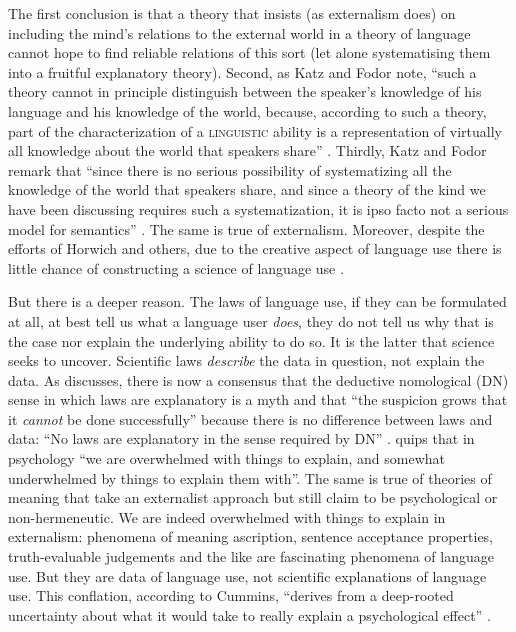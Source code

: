 The first conclusion is that a theory that insists (as externalism does) on including the mind’s relations to the external world in a theory of language cannot hope to find reliable relations of this sort (let alone systematising them into a fruitful explanatory theory). Second, as Katz and Fodor note, “such a theory cannot in principle distinguish between the speaker's knowledge of his language and his knowledge of the world, because, according to such a theory, part of the characterization of a \textsc{linguistic} ability is a representation of virtually all knowledge about the world that speakers share” \citep[179, emphasis in original]{KatzFodor1963}. Thirdly, Katz and Fodor remark that “since there is no serious possibility of systematizing all the knowledge of the world that speakers share, and since a theory of the kind we have been discussing requires such a systematization, it is ipso facto not a serious model for semantics” \citep[179]{KatzFodor1963}. The same is true of externalism. Moreover, despite the efforts of Horwich and others, due to the creative aspect of language use there is little chance of constructing a science of language use \citep{Chomsky1966,McGilvray2001,McGilvray2005,Asoulin2013}.

But there is a deeper reason. The laws of language use, if they can be formulated at all, at best tell us what a language user \textit{does}, they do not tell us why that is the case nor explain the underlying ability to do so. It is the latter that science seeks to uncover. Scientific laws \textit{describe} the data in question, not explain the data. As \citet{Cummins2000} discusses, there is now a consensus that the deductive nomological (DN) sense in which laws are explanatory is a myth and that “the suspicion grows that it \textit{cannot} be done successfully” because there is no difference between laws and data: “No laws are explanatory in the sense required by DN” \citep[119, emphasis in original]{Cummins2000}. \citet[120]{Cummins2000} quips that in psychology “we are overwhelmed with things to explain, and somewhat underwhelmed by things to explain them with”. The same is true of theories of meaning that take an externalist approach but still claim to be psychological or non-hermeneutic. We are indeed overwhelmed with things to explain in externalism: phenomena of meaning ascription, sentence acceptance properties, truth-evaluable judgements and the like are fascinating phenomena of language use. But they are data of language use, not scientific explanations of language use. This conflation, according to Cummins, “derives from a deep-rooted uncertainty about what it would take to really explain a psychological effect” \citep[121]{Cummins2000}. 

